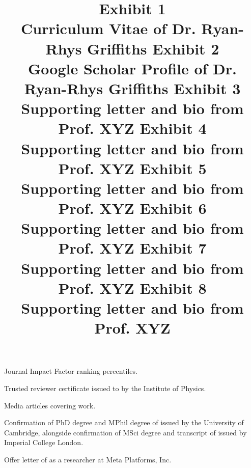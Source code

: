 \documentclass[11pt]{article}
\begin{document}
\begin{thebibliography}{9}
Journal Impact Factor ranking percentiles.

Trusted reviewer certificate issued to \dr by the Institute of Physics.

Media articles covering \drs work.

Confirmation of PhD degree and MPhil degree of \dr issued by the University of Cambridge, alongside confirmation of MSci degree and transcript of \dr issued by Imperial College London.

Offer letter of \dr as a researcher at Meta Platforms, Inc.

\end{thebibliography}

\pagebreak

\newcommand{\ip}[1]{}
\newcommand{\ex}[2]{
\title{\textbf{\huge{Exhibit #1}}\\
\vspace{3em}
\Large{#2}
}
\author{}
\maketitle
}


\ex{1}{Curriculum Vitae of Dr. Ryan-Rhys Griffiths}
\ip{aux/CV_new3.pdf}
  
\ex{2}{Google Scholar Profile of Dr. Ryan-Rhys Griffiths}
\ip{aux/google_scholar_recent3.pdf}
 
\ex{3}{Supporting letter and bio from Prof. XYZ}



\ex{4}{Supporting letter and bio from Prof. XYZ}


 
 \ex{5}{Supporting letter and bio from Prof. XYZ}
 

 
 \ex{6}{Supporting letter and bio from Prof. XYZ}
 

 
 \ex{7}{Supporting letter and bio from Prof. XYZ}
 

 
 \ex{8}{Supporting letter and bio from Prof. XYZ}
 
 
\end{document}
